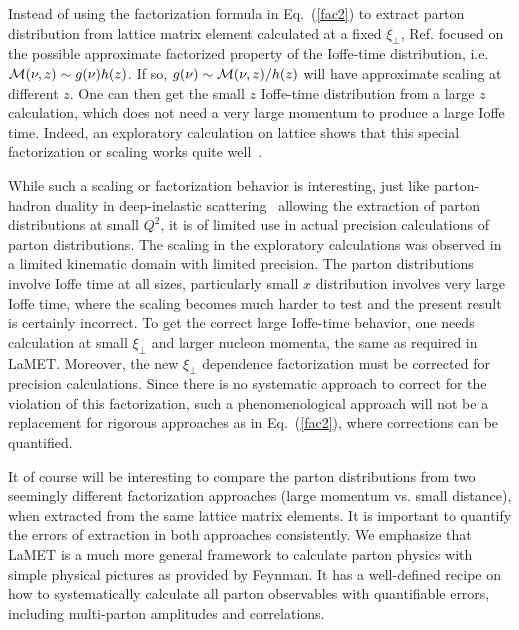Instead of using the factorization formula in Eq.~(\ref{fac2}) to extract parton distribution
from lattice matrix element calculated at a fixed $\xi_\perp$, Ref. \cite{Radyushkin:2017cyf}
focused on the possible approximate factorized property of the Ioffe-time distribution,
i.e. ${\cal M}(\nu, z) \sim  g(\nu)h(z)$. If so, $g(\nu) \sim {\cal M}(\nu, z)/h(z)$ will have approximate
scaling at different $z$. One can then get the small $z$
Ioffe-time distribution from a large $z$ calculation, which does not need a very large
momentum to produce a large Ioffe time. Indeed, an exploratory calculation on lattice
shows that this special factorization or scaling works quite well~\cite{Orginos:2017kos}.

While such a scaling or factorization behavior is interesting, just like parton-hadron duality
in deep-inelastic scattering~\cite{Ji:1994br} allowing the extraction of parton distributions at small $Q^2$, it is of limited use in actual precision calculations
of parton distributions. The scaling in the exploratory calculations
was observed in a limited kinematic domain with limited precision.
The parton distributions involve Ioffe time at all sizes, particularly small
$x$ distribution involves very large Ioffe time, where the scaling becomes much harder to test
and the present result is certainly incorrect. To get the correct
large Ioffe-time behavior, one needs calculation at small $\xi_\perp$ and larger nucleon momenta, the same
as required in LaMET. Moreover, the new $\xi_\perp$ dependence factorization must be corrected
for precision calculations. Since there is no systematic approach to correct for the violation
of this factorization, such a phenomenological approach
will not be a replacement for rigorous approaches as in Eq.~(\ref{fac2}), where
corrections can be quantified.

It of course will be interesting to compare the parton distributions from two seemingly
different factorization approaches (large momentum vs. small distance), when extracted from the same lattice matrix elements.
It is important to quantify the errors of extraction in both approaches consistently.
We emphasize that LaMET is a much more general framework to calculate parton physics
with simple physical pictures as provided by Feynman. It has a well-defined recipe on
how to systematically calculate all parton observables with quantifiable errors,
including multi-parton amplitudes and correlations.
